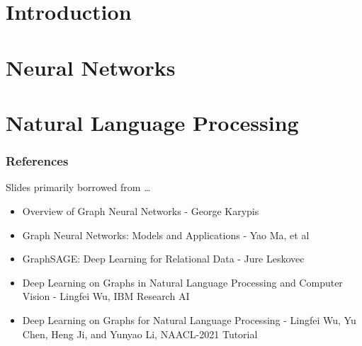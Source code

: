 \section[Intro]{Introduction}


\section[GNN]{Neural Networks}


\section[NLP]{Natural Language Processing}


\begin{frame}[fragile]\frametitle{References}
Slides primarily borrowed from \ldots

\begin{itemize}
\item Overview of Graph Neural Networks - George Karypis
\item Graph Neural Networks: Models and Applications - Yao Ma, et al
\item GraphSAGE: Deep Learning for Relational Data - Jure Leskovec
\item Deep Learning on Graphs in Natural Language Processing and Computer Vision - Lingfei Wu, IBM Research AI
\item Deep Learning on Graphs for Natural Language Processing - Lingfei Wu, Yu Chen, Heng Ji, and Yunyao Li, NAACL-2021 Tutorial

\end{itemize}

\end{frame}
